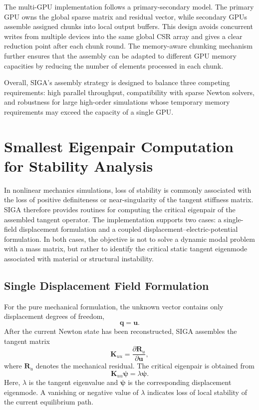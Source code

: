 \documentclass[11pt]{article}
\begin{document}
The multi-GPU implementation follows a primary-secondary model. The primary GPU owns the global sparse matrix and residual vector, while secondary GPUs assemble assigned chunks into local output buffers. This design avoids concurrent writes from multiple devices into the same global CSR array and gives a clear reduction point after each chunk round. The memory-aware chunking mechanism further ensures that the assembly can be adapted to different GPU memory capacities by reducing the number of elements processed in each chunk.

Overall, SIGA's assembly strategy is designed to balance three competing requirements: high parallel throughput, compatibility with sparse Newton solvers, and robustness for large high-order simulations whose temporary memory requirements may exceed the capacity of a single GPU.

\section{Smallest Eigenpair Computation for Stability Analysis}
\label{sec:smallest_eigenpair}

In nonlinear mechanics simulations, loss of stability is commonly associated with the loss of positive definiteness or near-singularity of the tangent stiffness matrix. SIGA therefore provides routines for computing the critical eigenpair of the assembled tangent operator. The implementation supports two cases: a single-field displacement formulation and a coupled displacement--electric-potential formulation. In both cases, the objective is not to solve a dynamic modal problem with a mass matrix, but rather to identify the critical static tangent eigenmode associated with material or structural instability.

\subsection{Single Displacement Field Formulation}

For the pure mechanical formulation, the unknown vector contains only displacement degrees of freedom,
\[
    \mathbf{q} = \mathbf{u}.
\]
After the current Newton state has been reconstructed, SIGA assembles the tangent matrix
\[
    \mathbf{K}_{uu} =
    \frac{\partial \mathbf{R}_{u}}{\partial \mathbf{u}},
\]
where \(\mathbf{R}_{u}\) denotes the mechanical residual. The critical eigenpair is obtained from
\[
    \mathbf{K}_{uu}\boldsymbol{\psi}
    =
    \lambda \boldsymbol{\psi}.
\]
Here, \(\lambda\) is the tangent eigenvalue and \(\boldsymbol{\psi}\) is the corresponding displacement eigenmode. A vanishing or negative value of \(\lambda\) indicates loss of local stability of the current equilibrium path.
\end{document}

